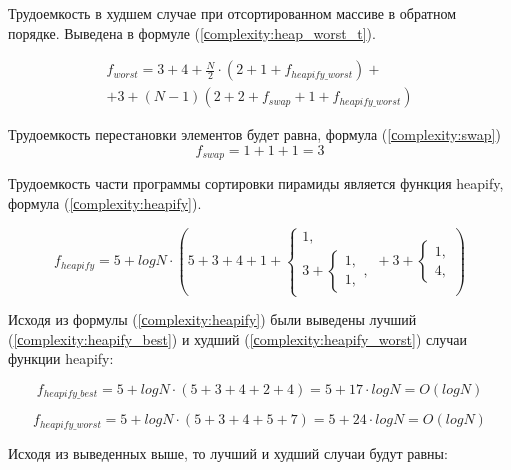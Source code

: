 Трудоемкость в худшем случае при отсортированном массиве в обратном порядке. Выведена в формуле (\ref{сomplexity:heap_worst_t}).

\begin{equation}
	\label{сomplexity:heap_worst_t}
	\begin{gathered}
		f_{worst} = 3 + 4 + \frac{N}{2} \cdot (2 + 1 + f_{heapify\_worst}) + \\
		+ 3 + (N - 1)(2 + 2 + f_{swap} + 1 + f_{heapify\_worst})
	\end{gathered}
\end{equation}

Трудоемкость перестановки элементов будет равна, формула (\ref{сomplexity:swap})
\begin{equation}
	\label{сomplexity:swap}
	f_{swap} = 1 + 1 + 1 = 3
\end{equation}

Трудоемкость части программы сортировки пирамиды является функция heapify, формула (\ref{сomplexity:heapify}).

\begin{equation}
	\label{сomplexity:heapify}
	f_{heapify} = 5 + log N \cdot (5 + 3 + 4 + 1 + 
	\begin{cases}
		1, \\
		3 + \begin{cases}
			1, \\
			1,
		\end{cases},
	\end{cases} + 3 +
	\begin{cases}
		1, \\
		4,
	\end{cases})
\end{equation}

Исходя из формулы (\ref{сomplexity:heapify}) были выведены лучший (\ref{сomplexity:heapify_best}) и худший (\ref{сomplexity:heapify_worst}) случаи функции heapify:

\begin{equation}
	\label{сomplexity:heapify_best}
	f_{heapify\_best} = 5 + log N \cdot (5 + 3 + 4 + 2 + 4) = 5 + 17 \cdot log N = O(log N) 
\end{equation}

\begin{equation}
	\label{сomplexity:heapify_worst}
	f_{heapify\_worst} = 5 + log N \cdot (5 + 3 + 4 + 5 + 7) = 5 + 24 \cdot log N = O(log N) 
\end{equation}

Исходя из выведенных выше, то лучший и худший случаи будут равны: 

